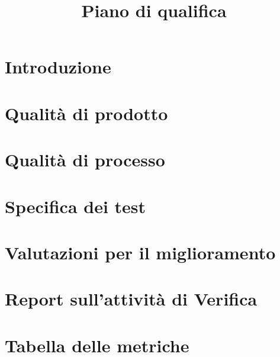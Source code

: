 \documentclass{article}
\title{Piano di qualifica}
\begin{document}


\newpage
\section{Introduzione}%
\label{sec:introduzione}



\newpage
\section{Qualità di prodotto}%
\label{sec:qualita_di_prodotto}



\newpage
\section{Qualità di processo}%
\label{sec:qualita_di_processo}



\newpage
\section{Specifica dei test}%
\label{sec:specifica_test}




\newpage
\section{Valutazioni per il miglioramento}%
\label{sec:valutazioni_miglioramento}




\newpage
\section{Report sull'attività di Verifica}%
\label{sec:report_verifica}



\newpage
\section{Tabella delle metriche}%
\label{sec:tabella_metriche}



\end{document}
